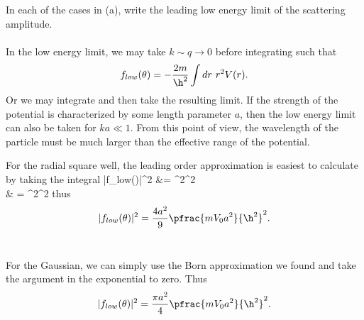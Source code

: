 \documentclass[10pt,letterpaper]{article}
\begin{document}
	\item
	In each of the cases in (a), write the leading low energy limit of the scattering amplitude.
	\\
	\\
	In the low energy limit, we may take $k\sim q \to 0$ before integrating such that
	\[
		f_{low}(\theta) = -\frac{2m}{\h^2}\int dr\ r^2 V(r).
	\]
	Or we may integrate and then take the resulting limit. If the strength of the potential is characterized by
	some length parameter $a$, then the low energy limit can also be taken for $ka\ll 1$. From this point of 
	view, the wavelength of the particle must be much larger than the effective range of the potential. 
	\\
	\benum
	\item
	For the radial square well, the leading order approximation is easiest to calculate by taking the integral
	\ba
		|f_{low}(\theta)|^2 &= ^2^2\\
		& = ^2^2	
	\ea
	thus
	\[
		|f_{low}(\theta)|^2 = \frac{4a^2}{9}\pfrac{mV_0a^2}{\h^2}^2.
	\]
	\\
	
	\item
	For the Gaussian, we can simply use the Born approximation we found and take the argument in the exponential to 	
	zero. Thus
	\[
		|f_{low}(\theta)|^2 = \frac{\pi a^2}{4}\pfrac{mV_0a^2}{\h^2}^2.
	\]
	\\
	
\end{document}
